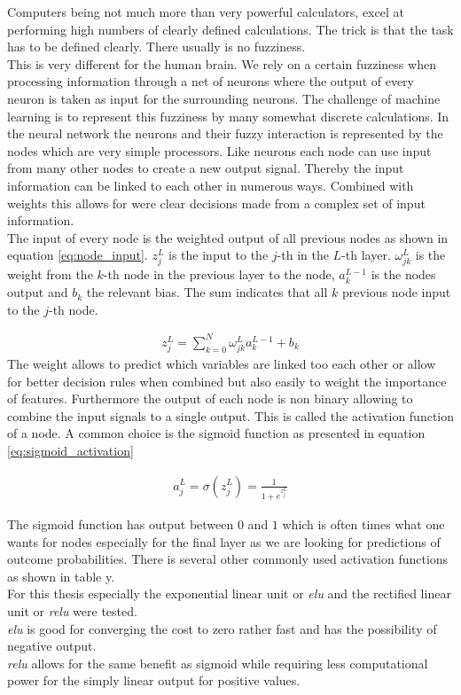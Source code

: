 Computers being not much more than very powerful calculators, excel at performing high numbers of clearly defined calculations. The trick is that the task has to be defined clearly. There usually is no fuzziness.\\
This is very different for the human brain. We rely on a certain fuzziness when processing information through a net of neurons where the output of every neuron is taken as input for the surrounding neurons. The challenge of machine learning is to represent this fuzziness by many somewhat discrete calculations. In the neural network the neurons and their fuzzy interaction is represented by the nodes which are very simple processors. Like neurons each node can use input from many other nodes to create a new output signal. Thereby the input information can be linked to each other in numerous ways. Combined with weights this allows for were clear decisions made from a complex set of input information.\\
The input of every node is the weighted output of all previous nodes as shown in equation \eqref{eq:node_input}. $z_j^L$ is the input to the $j$-th in the $L$-th layer. $\omega_{jk}^L$ is the weight from the $k$-th node in the previous layer to the node, $a_k^{L-1}$ is the nodes output and $b_k$ the relevant bias. The sum indicates that all $k$ previous node input to the $j$-th node.

\begin{align}
    z_j^L = \sum_{k=0}^{N} \omega_{jk}^L a_k^{L-1} + b_k
    \label{eq:node_input}
\end{align}
The weight allows to predict which variables are linked too each other or allow for better decision rules when combined but also easily to weight the importance of features. Furthermore the output of each node is non binary allowing to combine the input signals to a single output. This is called the activation function of a node. A common choice is the sigmoid function as presented in equation \eqref{eq:sigmoid_activation}

\begin{align}
    a_j^L = \sigma ( z_j^L ) = \frac{1}{1 + e^{z_j^L}}
    \label{eq:sigmoid_activation}
\end{align}

The sigmoid function has output between $0$ and $1$ which is often times what one wants for nodes especially for the final layer as we are looking for predictions of outcome probabilities. There is several other commonly used activation functions as shown in table y.\\
For this thesis especially the exponential linear unit or \textit{elu} and the rectified linear unit or \textit{relu} were tested.\\
\textit{elu} is good for converging the cost to zero rather fast and has the possibility of negative output.\\
\textit{relu} allows for the same benefit as sigmoid while requiring less computational power for the simply linear output for positive values.

